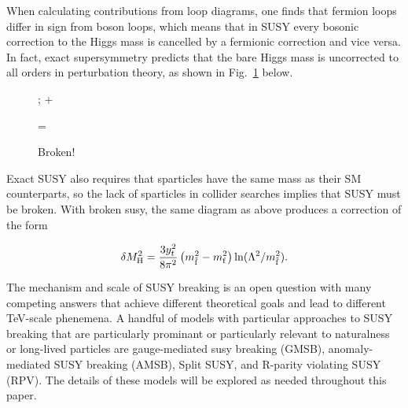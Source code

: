 \documentclass[12pt]{article}
\begin{document}
    When calculating contributions from loop diagrams, one finds that fermion loops differ in sign from boson loops, which means that in SUSY every bosonic correction to the Higgs mass is cancelled by a fermionic correction and vice versa. In fact, exact supersymmetry predicts that the bare Higgs mass is uncorrected to all orders in perturbation theory, as shown in Fig.~\ref{exact_susy_correction} below.
    
    \noindent \begin{figure}[htbp] \begin{center}
        ;
    \quad + \quad
    \quad =  \quad
    \caption{Broken!}
    \label{exact_susy_correction}
    \end{center} \end{figure}

    Exact SUSY also requires that sparticles have the same mass as their SM counterparts, so the lack of sparticles in collider searches implies that SUSY must be broken. With broken susy, the same diagram as above produces a correction of the form  

    \noindent \begin{equation}
        \delta M_{\mathrm{H}}^2 = \frac{3y_t^2}{8\pi^2}\left(m_{\tilde{\mathrm{f}}}^2 - m_{\mathrm{f}}^2 \right)\ln(\Lambda^2/m_{\tilde{\mathrm{f}}}^2).
    \label{higgs_susy_correction}
    \end{equation}
    
    The mechanism and scale of SUSY breaking is an open question with many competing answers that achieve different theoretical goals and lead to different TeV-scale phenemena. A handful of models with particular approaches to SUSY breaking that are particularly prominant or particularly relevant to naturalness or long-lived particles are gauge-mediated susy breaking (GMSB), anomaly-mediated SUSY breaking (AMSB), Split SUSY, and R-parity violating SUSY (RPV). The details of these models will be explored as needed throughout this paper.
\end{document}
